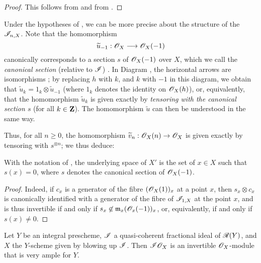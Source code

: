 \begin{proof}
\label{proof-2.8.1.8}
This follows from  and from .
\end{proof}

\begin{env}[8.1.9]
\label{2.8.1.9}
Under the hypotheses of , we can be more precise about the structure of the $\mathscr{I}_{n,X}$.
Note that the homomorphism
\[
  \widetilde{u}_{-1}: \sh{O}_X \to \sh{O}_X(-1)
\]
canonically corresponds to a section $s$ of $\mathscr{O}_X(-1)$ over $X$, which we call the \emph{canonical section} (relative to $\mathscr{I}$) .
In Diagram , the horizontal arrows are isomorphisms ; by replacing $h$ with $k$, and $k$ with $-1$ in this diagram, we obtain that $\widetilde{u}_k = 1_k \otimes \widetilde{u}_{-1}$ (where $1_k$ denotes the identity on $\mathscr{O}_X(h)$), or, equivalently, that the homomorphism $\widetilde{u}_k$ is given exactly by \emph{tensoring with the canonical section $s$} (for all $k\in\mathbf{Z}$).
The homomorphism $\widetilde{u}$  can then be understood in the same way.

Thus, for all $n\geq0$, the homomorphism $\widetilde{v}_n: \sh{O}_X(n)\to\sh{O}_X$ is given exactly by tensoring with $s^{\otimes n}$;
we thus deduce:
\end{env}

\begin{corollary}[8.1.10]
\label{2.8.1.10}
With the notation of , the underlying space of $X'$ is the set of $x\in X$ such that $s(x)=0$, where $s$ denotes the canonical section of $\mathscr{O}_X(-1)$.
\end{corollary}

\begin{proof}
\label{proof-2.8.1.10}
Indeed, if $c_x$ is a generator of the fibre $(\mathscr{O}_X(1))_x$ at a point $x$, then $s_x\otimes c_x$ is canonically identified with a generator of the fibre of $\mathscr{I}_{1,X}$ at the point $x$, and is thus invertible if and only if $s_x\not\in\mathfrak{m}_x(\mathscr{O}_x(-1))_x$, or, equivalently, if and only if $s(x)\neq0$.
\end{proof}

\begin{proposition}
\label{2.8.1.11}
Let $Y$ be an integral prescheme, $\mathscr{I}$ a quasi-coherent fractional ideal of $\mathscr{R}(Y)$, and $X$ the $Y$-scheme given by blowing up $\mathscr{I}$.
Then $\mathscr{I}\mathscr{O}_X$ is an invertible $\mathscr{O}_X$-module that is very ample for $Y$.
\end{proposition}

